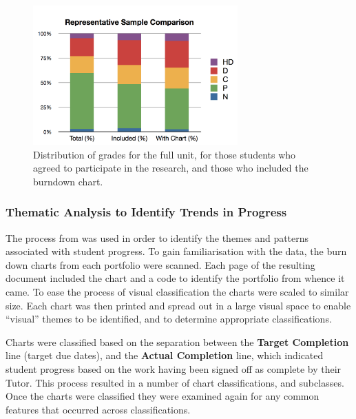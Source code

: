 \begin{figure}[thbp]
  \centering
  \includegraphics[width=0.7\textwidth]{ProgressGradeDistributions}
  \caption{Distribution of grades for the full unit, for those students who agreed to participate in the research, and those who included the burndown chart.}
  \label{fig:progress_grade_dist}
\end{figure}


\subsubsection{Thematic Analysis to Identify Trends in Progress} %
\label{sub:approach_to_analysis}

The process from  was used in order to identify the themes and patterns associated with student progress. To gain familiarisation with the data, the burn down charts from each portfolio were scanned. Each page of the resulting document included the chart and a code to identify the portfolio from whence it came. To ease the process of visual classification the charts were scaled to similar size. Each chart was then printed and spread out in a large visual space to enable ``visual'' themes to be identified, and to determine appropriate classifications. 

Charts were classified based on the separation between the \textbf{Target Completion} line (target due dates), and the \textbf{Actual Completion} line, which indicated student progress based on the work having been signed off as complete by their Tutor. This process resulted in a number of chart classifications, and subclasses. Once the charts were classified they were examined again for any common features that occurred across classifications. 


